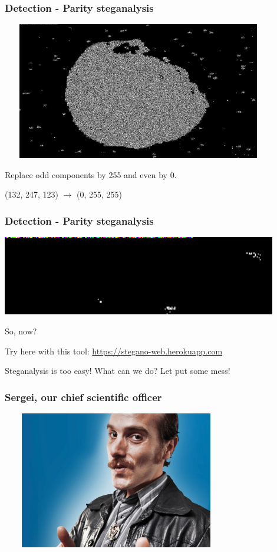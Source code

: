 \documentclass[]{beamer}
\begin{document}
\begin{frame}
\frametitle{Detection - Parity steganalysis}
\begin{center}
    \includegraphics[height=6.0cm, width=12.0cm]{./images/vesta_steg.png}
\end{center}
Replace odd components by 255 and even by 0.

(132, 247, 123) $\longrightarrow$ (0, 255, 255)
\end{frame}

\begin{frame}
\frametitle{Detection - Parity steganalysis}
\begin{center}
\includegraphics[width=12.0cm]{./images/vesta_steg_zoom.png}
\end{center}
\bigskip
So, now?

\bigskip
Try here with this tool: \href{https://stegano-web.herokuapp.com}{https://stegano-web.herokuapp.com}

\bigskip 
Steganalysis is too easy! What can we do? Let put some mess!
\end{frame}

\begin{frame}
\frametitle{Sergei, our chief scientific officer}
\begin{center}
    \includegraphics[height=6.0cm, width=10.0cm]{./images/Sergei.png}
\end{center}
\end{frame}
\end{document}
